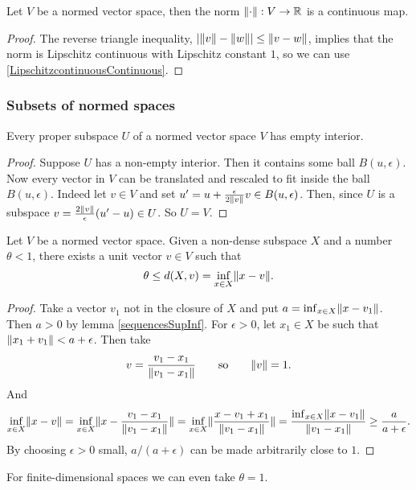 \begin{proposition}
Let $V$ be a normed vector space, then the norm $\lVert\cdot\rVert:V\to \mathbb{R}$ is a continuous map.
\end{proposition}
\begin{proof}
The reverse triangle inequality, $|\lVert v\rVert-\lVert w\rVert| \leq \lVert v-w\rVert$, implies that the norm is Lipschitz continuous with Lipschitz constant $1$, so we can use \ref{LipschitzcontinuousContinuous}.
\end{proof}

\subsubsection{Subsets of normed spaces}

\begin{lemma}
Every proper subspace $U$ of a normed vector space $V$ has empty interior.
\end{lemma}
\begin{proof}
Suppose $U$ has a non-empty interior. Then it contains some ball $B(u,\epsilon)$. Now every vector in $V$ can be translated and rescaled to fit inside the ball $B(u,\epsilon)$. Indeed let $v\in V$ and set $u' = u+ \frac{\epsilon}{2\lVert v\rVert}v \in B(u,\epsilon)$. Then, since $U$ is a subspace $v = \frac{2\lVert v\rVert}{\epsilon}(u'-u)\in U$. So $U=V$.
\end{proof}

\begin{lemma} \label{RieszsLemma}
Let $V$ be a normed vector space. Given a non-dense subspace $X$ and a number $\theta<1$, there exists a unit vector $v\in V$ such that
\[ \theta \leq d(X,v) = \inf_{x\in X}\lVert x-v\rVert. \]
\end{lemma}
\begin{proof}
Take a vector $v_1$ not in the closure of $X$ and put $a = \inf_{x\in X}\lVert x-v_1\rVert$. Then $a>0$ by lemma \ref{sequencesSupInf}. For $\epsilon > 0$, let $x_1\in X$ be such that $\lVert x_1+v_1\rVert<a+\epsilon$. Then take
\[ v = \frac{v_1 - x_1}{\lVert v_1-x_1\rVert} \qquad \text{so} \qquad \lVert v\rVert=1. \]
And
\[ \inf_{x\in X}\lVert x-v\rVert = \inf_{x\in X}\lVert x-\frac{v_1 - x_1}{\lVert v_1-x_1\rVert}\rVert = \inf_{x\in X}\lVert\frac{x-v_1 + x_1}{\lVert v_1-x_1\rVert}\rVert = \frac{\inf_{x\in X}\lVert x-v_1\rVert}{\lVert v_1-x_1\rVert} \geq \frac{a}{a+\epsilon}. \]
By choosing $\epsilon >0$ small, $a/(a+\epsilon)$ can be made arbitrarily close to $1$.
\end{proof}
For finite-dimensional spaces we can even take $\theta=1$.

